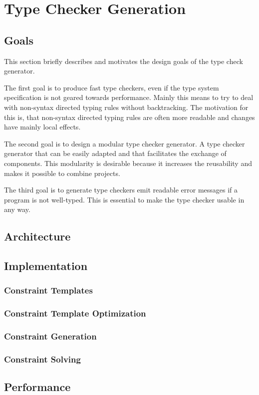 \chapter{Type Checker Generation}
\section{Goals}
This section briefly describes and motivates the design goals of the
type check generator.

The first goal is to produce fast type checkers, even if the type
system specification is not geared towards performance. Mainly this
means to try to deal with non-syntax directed typing rules without
backtracking. The motivation for this is, that non-syntax directed
typing rules are often more readable and changes have mainly local
effects.

The second goal is to design a modular type checker generator. A type
checker generator that can be easily adapted and that facilitates the
exchange of components. This modularity is desirable because it
increases the reusability and makes it possible to combine projects.

The third goal is to generate type checkers emit readable error
messages if a program is not well-typed. This is essential to make the
type checker usable in any way.
\section{Architecture}

\section{Implementation}
\subsection{Constraint Templates}
\subsection{Constraint Template Optimization}
\subsection{Constraint Generation}
\subsection{Constraint Solving}
\section{Performance}

